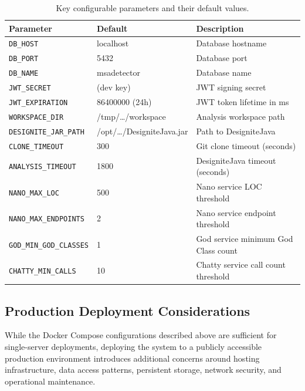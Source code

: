 \begin{table}[htbp]
    \centering
    \footnotesize
    \begin{tabular}{|l|l|p{4.5cm}|}
        \hline
        \textbf{Parameter} & \textbf{Default} & \textbf{Description} \\
        \hline\hline
        \texttt{DB\_HOST} & localhost & Database hostname \\
        \hline
        \texttt{DB\_PORT} & 5432 & Database port \\
        \hline
        \texttt{DB\_NAME} & msadetector & Database name \\
        \hline
        \texttt{JWT\_SECRET} & (dev key) & JWT signing secret \\
        \hline
        \texttt{JWT\_EXPIRATION} & 86400000 (24h) & JWT token lifetime in ms \\
        \hline
        \texttt{WORKSPACE\_DIR} & /tmp/\ldots/workspace & Analysis workspace path \\
        \hline
        \texttt{DESIGNITE\_JAR\_PATH} & /opt/\ldots/DesigniteJava.jar & Path to DesigniteJava \\
        \hline
        \texttt{CLONE\_TIMEOUT} & 300 & Git clone timeout (seconds) \\
        \hline
        \texttt{ANALYSIS\_TIMEOUT} & 1800 & DesigniteJava timeout (seconds) \\
        \hline
        \texttt{NANO\_MAX\_LOC} & 500 & Nano service LOC threshold \\
        \hline
        \texttt{NANO\_MAX\_ENDPOINTS} & 2 & Nano service endpoint threshold \\
        \hline
        \texttt{GOD\_MIN\_GOD\_CLASSES} & 1 & God service minimum God Class count \\
        \hline
        \texttt{CHATTY\_MIN\_CALLS} & 10 & Chatty service call count threshold \\
        \hline
    \end{tabular}
    \caption{Key configurable parameters and their default values.}
    \label{tab:config-params}
\end{table}

\subsection{Production Deployment Considerations}
\label{subsec:prod-deployment}

\par While the Docker Compose configurations described above are sufficient for single-server deployments, deploying the system to a publicly accessible production environment introduces additional concerns around hosting infrastructure, data access patterns, persistent storage, network security, and operational maintenance.

